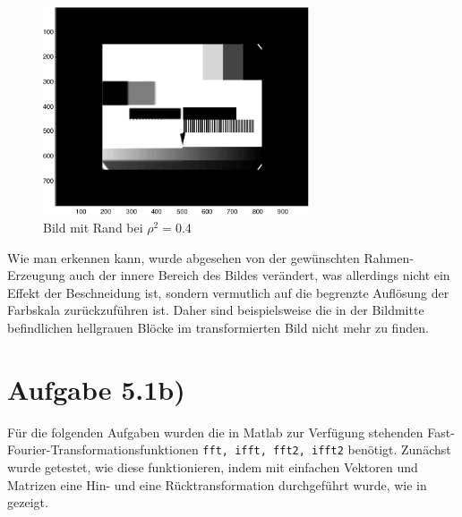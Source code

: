 \begin{figure}[htb]
\centering
  \includegraphics[width=0.7\textwidth,keepaspectratio]{../tmp/eins_a-crop.pdf}
  \caption{Bild mit Rand bei $ρ^2 = 0.4$}
  \label{fig:1a}
\end{figure}

Wie man erkennen kann, wurde abgesehen von der gewünschten Rahmen-Erzeugung
auch der innere Bereich des Bildes verändert, was allerdings nicht ein Effekt der
Beschneidung ist, sondern vermutlich auf die begrenzte Auflösung der Farbskala 
zurückzuführen ist. Daher sind beispielsweise die in der Bildmitte befindlichen
hellgrauen Blöcke im transformierten Bild nicht mehr zu finden. 

\section*{Aufgabe 5.1b)}
Für die folgenden Aufgaben wurden die in Matlab zur Verfügung stehenden 
Fast-Fourier-Transformationsfunktionen \texttt{fft, ifft, fft2, ifft2} benötigt.
Zunächst wurde getestet, wie diese funktionieren, indem mit einfachen Vektoren und
Matrizen eine Hin- und eine Rücktransformation durchgeführt wurde, wie in 
 gezeigt.



